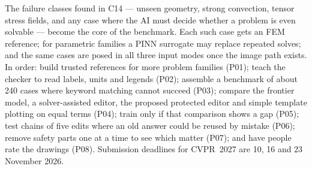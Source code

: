 \documentclass[11pt,a4paper]{article}
\begin{document}
The failure classes found in C14 --- unseen geometry, strong convection, tensor stress fields, and any case where the AI must decide whether a problem is even solvable --- become the core of the benchmark. Each such case gets an FEM reference; for parametric families a PINN surrogate may replace repeated solves; and the same cases are posed in all three input modes once the image path exists. In order: build trusted references for more problem families (P01); teach the checker to read labels, units and legends (P02); assemble a benchmark of about 240 cases where keyword matching cannot succeed (P03); compare the frontier model, a solver-assisted editor, the proposed protected editor and simple template plotting on equal terms (P04); train only if that comparison shows a gap (P05); test chains of five edits where an old answer could be reused by mistake (P06); remove safety parts one at a time to see which matter (P07); and have people rate the drawings (P08). Submission deadlines for CVPR~2027 are 10, 16 and 23 November 2026.

\end{document}
